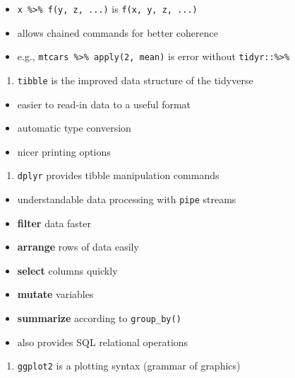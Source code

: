 \documentclass[]{book}
\providecommand{\tightlist}{%
  \setlength{\itemsep}{0pt}\setlength{\parskip}{0pt}}
\begin{document}
\begin{itemize}
\tightlist
\item
  \texttt{x\ \%\textgreater{}\%\ f(y,\ z,\ ...)} is
  \texttt{f(x,\ y,\ z,\ ...)}
\item
  allows chained commands for better coherence
\item
  e.g., \texttt{mtcars\ \%\textgreater{}\%\ apply(2,\ mean)} is error
  without \texttt{tidyr::\%\textgreater{}\%}
\end{itemize}

\begin{enumerate}
\def\labelenumi{\arabic{enumi}.}
\setcounter{enumi}{1}
\tightlist
\item
  \texttt{tibble} is the improved data structure of the tidyverse
\end{enumerate}

\begin{itemize}
\tightlist
\item
  easier to read-in data to a useful format
\item
  automatic type conversion
\item
  nicer printing options
\end{itemize}

\begin{enumerate}
\def\labelenumi{\arabic{enumi}.}
\setcounter{enumi}{2}
\tightlist
\item
  \texttt{dplyr} provides tibble manipulation commands
\end{enumerate}

\begin{itemize}
\tightlist
\item
  understandable data processing with \texttt{pipe} streams
\item
  \textbf{filter} data faster
\item
  \textbf{arrange} rows of data easily
\item
  \textbf{select} columns quickly
\item
  \textbf{mutate} variables
\item
  \textbf{summarize} according to \texttt{group\_by()}
\item
  also provides SQL relational operations
\end{itemize}

\begin{enumerate}
\def\labelenumi{\arabic{enumi}.}
\setcounter{enumi}{3}
\tightlist
\item
  \texttt{ggplot2} is a plotting syntax (grammar of graphics)
\end{enumerate}
\end{document}
